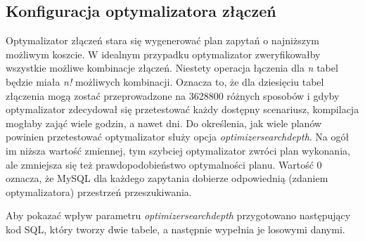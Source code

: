 \subsection{Konfiguracja optymalizatora złączeń}
Optymalizator złączeń stara się wygenerować plan zapytań o najniższym możliwym koszcie. W idealnym przypadku optymalizator zweryfikowałby wszystkie możliwe kombinacje złączeń. Niestety operacja łączenia dla \textit{n} tabel będzie miała \textit{n!} możliwych kombinacji. Oznacza to, że dla dziesięciu tabel złączenia mogą zostać przeprowadzone na 3628800 różnych sposobów i gdyby optymalizator zdecydował się przetestować każdy dostępny scenariusz, kompilacja mogłaby zająć wiele godzin, a nawet dni. Do określenia, jak wiele planów powinien przetestować optymalizator służy opcja \textit{optimizer\textunderscore search\textunderscore depth}. Na ogół im niższa wartość zmiennej, tym szybciej optymalizator zwróci plan wykonania, ale zmniejsza się też prawdopodobieństwo optymalności planu. Wartość 0 oznacza, że MySQL dla każdego zapytania dobierze odpowiednią (zdaniem optymalizatora) przestrzeń przeszukiwania.

Aby pokazać wpływ parametru \textit{optimizer\textunderscore search\textunderscore depth} przygotowano następujący kod SQL, który tworzy dwie tabele, a następnie wypełnia je losowymi danymi.

